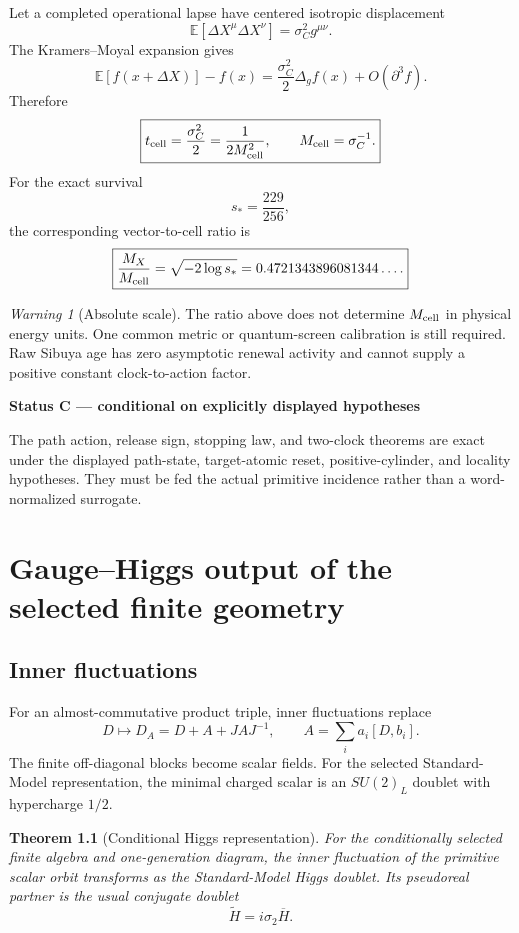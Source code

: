 \documentclass[11pt,oneside,openany]{book}
\numberwithin{equation}{chapter}
\newtheorem{theorem}{Theorem}[chapter]
\theoremstyle{definition}
\theoremstyle{remark}
\newtheorem{warning}[theorem]{Warning}
\newenvironment{statusbox}[2]{%
  \par\medskip\noindent
  \begin{center}\begin{minipage}{0.94\textwidth}
  \colorbox{#1!8}{\parbox{\dimexpr\linewidth-2\fboxsep\relax}{\textbf{#2}}}\par\smallskip
}{%
  \end{minipage}\end{center}\medskip
}
\newcommand{\Conditional}[1]{\begin{statusbox}{CondColor}{Status C --- conditional on explicitly displayed hypotheses}#1\end{statusbox}}
\begin{document}
Let a completed operational lapse have centered isotropic displacement
\[
 \mathbb E[\Delta X^\mu\Delta X^\nu]
 =
 \sigma_C^2g^{\mu\nu}.
\]
The Kramers--Moyal expansion gives
\[
 \mathbb E[f(x+\Delta X)]-f(x)
 =
 \frac{\sigma_C^2}{2}\Delta_gf(x)+O(\partial^3f).
\]
Therefore
\[
 \boxed{
 t_{\rm cell}=\frac{\sigma_C^2}{2}
 =
 \frac1{2M_{\rm cell}^2},
 \qquad
 M_{\rm cell}=\sigma_C^{-1}.}
\]
For the exact survival
\[
 s_*=\frac{229}{256},
\]
the corresponding vector-to-cell ratio is
\[
 \boxed{
 \frac{M_X}{M_{\rm cell}}
 =
 \sqrt{-2\log s_*}
 =
 0.4721343896081344\ldots.}
\]

\begin{warning}[Absolute scale]
The ratio above does not determine \(M_{\rm cell}\) in physical energy units.
One common metric or quantum-screen calibration is still required.  Raw
Sibuya age has zero asymptotic renewal activity and cannot supply a positive
constant clock-to-action factor.
\end{warning}

\Conditional{The path action, release sign, stopping law, and two-clock
theorems are exact under the displayed path-state, target-atomic reset,
positive-cylinder, and locality hypotheses.  They must be fed the actual
primitive incidence rather than a word-normalized surrogate.}

\chapter{Gauge--Higgs output of the selected finite geometry}
\label{ch:spectral-action}

\section{Inner fluctuations}
For an almost-commutative product triple, inner fluctuations replace
\[
 D\longmapsto D_A=D+A+JAJ^{-1},
 \qquad
 A=\sum_ia_i[D,b_i].
\]
The finite off-diagonal blocks become scalar fields.  For the selected Standard-Model representation, the minimal charged scalar is an $SU(2)_L$ doublet with hypercharge $1/2$.

\begin{theorem}[Conditional Higgs representation]
\label{thm:higgs-representation}
For the conditionally selected finite algebra and one-generation diagram, the inner fluctuation of the primitive scalar orbit transforms as the Standard-Model Higgs doublet.  Its pseudoreal partner is the usual conjugate doublet
\[
 \widetilde H=i\sigma_2\overline H.
\]
\end{theorem}
\end{document}
